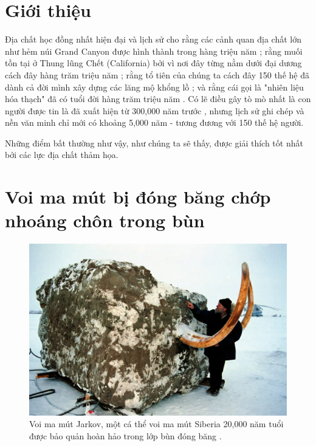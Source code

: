 \documentclass[10pt,twocolumn,letterpaper]{article}
\begin{document}

\section{Giới thiệu}

Địa chất học đồng nhất hiện đại và lịch sử cho rằng các cảnh quan địa chất lớn như hẻm núi Grand Canyon được hình thành trong hàng triệu năm \cite{143}; rằng muối tồn tại ở Thung lũng Chết (California) bởi vì nơi đây từng nằm dưới đại dương cách đây hàng trăm triệu năm \cite{144}; rằng tổ tiên của chúng ta cách đây 150 thế hệ đã dành cả đời mình xây dựng các lăng mộ khổng lồ \cite{29,70}; và rằng cái gọi là "nhiên liệu hóa thạch" đã có tuổi đời hàng trăm triệu năm \cite{104}. Có lẽ điều gây tò mò nhất là con người được tin là đã xuất hiện từ 300,000 năm trước \cite{145}, nhưng lịch sử ghi chép và nền văn minh chỉ mới có khoảng 5,000 năm - tương đương với 150 thế hệ người.

Những điểm bất thường như vậy, như chúng ta sẽ thấy, được giải thích tốt nhất bởi các lực địa chất thảm họa.

\section{Voi ma mút bị đóng băng chớp nhoáng chôn trong bùn}

\begin{figure}[t]
\begin{center}
   \includegraphics[width=1\linewidth]{jarkov-mammoth.jpg}
\end{center}
   \caption{Voi ma mút Jarkov, một cá thể voi ma mút Siberia 20,000 năm tuổi được bảo quản hoàn hảo trong lớp bùn đóng băng \cite{51}.}
\label{fig:1}
\label{fig:onecol}
\end{figure}
\end{document}
